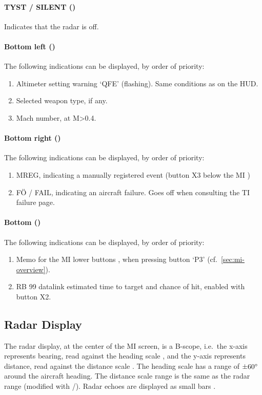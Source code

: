 \paragraph{TYST / SILENT ()}
Indicates that the radar is off.

\paragraph{Bottom left ()}
The following indications can be displayed, by order of priority:
\begin{enumerate}[nosep]
  \item Altimeter setting warning `QFE' (flashing). Same conditions as on the HUD.
  \item Selected weapon type, if any.
  \item Mach number, at M>0.4.
\end{enumerate}

\paragraph{Bottom right ()}
The following indications can be displayed, by order of priority:
\begin{enumerate}[nosep]
  \item MREG, indicating a manually registered event (button X3 below the MI )
  \item FÖ / FAIL, indicating an aircraft failure. Goes off when consulting the TI failure page.
\end{enumerate}

\paragraph{Bottom ()}
The following indications can be displayed, by order of priority:
\begin{enumerate}[nosep]
  \item Memo for the MI lower buttons ,
    when pressing button `P3' (cf.~\cref{sec:mi-overview}).
  \item RB 99 datalink estimated time to target and chance of hit,
    enabled with button X2.
\end{enumerate}

\subsection{Radar Display}
The radar display, at the center of the MI screen, is a B-scope,
i.e.\ the x-axis represents bearing, read against the heading scale ,
and the y-axis represents distance, read against the distance scale .
The heading scale has a range of $\pm 60\degree$ around the aircraft heading.
The distance scale range is the same as the radar range (modified with \keys{[}/\keys{]}).
Radar echoes are displayed as small bars .

